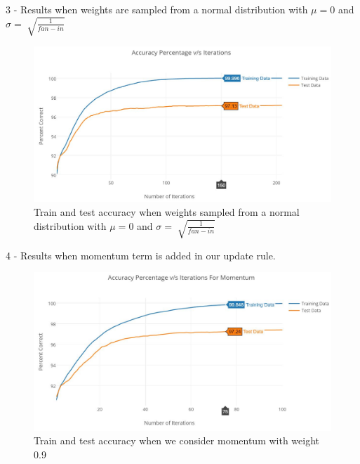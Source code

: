 \documentclass{article}
\begin{document}
3 - Results when weights are sampled from a normal distribution with $\mu=0$ and $\sigma = \sqrt[]{\frac{1}{fan-in}}$

\begin{figure}[h!]
  \centering
  \includegraphics[width=\linewidth]{graphs/Q4d_300HU_point1_500Iter_128.JPG}
  \caption{Train and test accuracy when weights sampled from a normal distribution with $\mu=0$ and $\sigma = \sqrt[]{\frac{1}{fan-in}}$}
  \label{fig:4d}
\end{figure}

4 - Results when momentum term is added in our update rule.
\pagebreak
\begin{figure}[t]
  \centering
  \includegraphics[width=\linewidth]{graphs/Q4e_point9Momentum_point1_128.JPG}
  \caption{Train and test accuracy when we consider momentum with weight 0.9}
  \label{fig:4e}
\end{figure}
\end{document}
